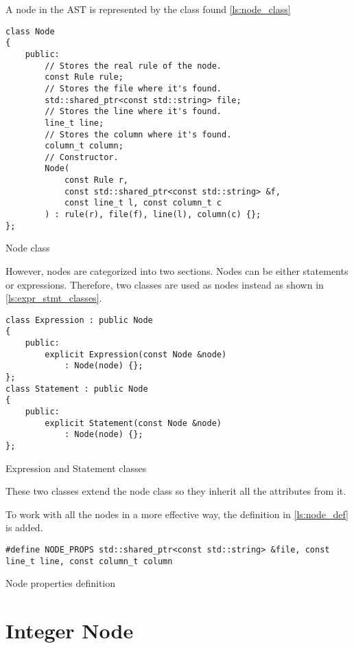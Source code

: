 

A node in the AST is represented by the class found \autoref{ls:node_class}

\begin{listing}[H]
\begin{verbatim}
class Node
{
    public:
        // Stores the real rule of the node.
        const Rule rule;
        // Stores the file where it's found.
        std::shared_ptr<const std::string> file;
        // Stores the line where it's found.
        line_t line;
        // Stores the column where it's found.
        column_t column;
        // Constructor.
        Node(
            const Rule r,
            const std::shared_ptr<const std::string> &f,
            const line_t l, const column_t c
        ) : rule(r), file(f), line(l), column(c) {};
};
\end{verbatim}
\caption{Node class}
\label{ls:node_class}
\end{listing}

However, nodes are categorized into two sections. Nodes can be either statements or expressions. Therefore, two classes
are used as nodes instead as shown in \autoref{ls:expr_stmt_classes}.

\begin{listing}[H]
\begin{verbatim}
class Expression : public Node
{
    public:
        explicit Expression(const Node &node)
            : Node(node) {};
};
class Statement : public Node
{
    public:
        explicit Statement(const Node &node)
            : Node(node) {};
};
\end{verbatim}
\caption{Expression and Statement classes}
\label{ls:expr_stmt_classes}
\end{listing}

These two classes extend the node class so they inherit all the attributes from it.

To work with all the nodes in a more effective way, the definition in \autoref{ls:node_def} is added.

\begin{listing}[H]
\begin{verbatim}
#define NODE_PROPS std::shared_ptr<const std::string> &file, const line_t line, const column_t column
\end{verbatim}
\caption{Node properties definition}
\label{ls:node_def}
\end{listing}

\section{Integer Node}

